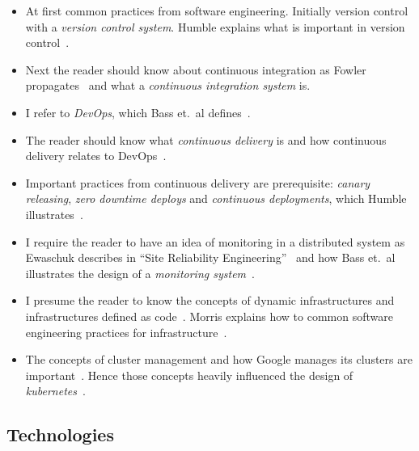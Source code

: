 \begin{itemize}

\item At first common practices from software engineering. Initially
  version control with a \emph{version control system}. Humble explains what is important in
  version control~\cite{cd_humble_config}.

\item Next the reader should know about continuous integration as Fowler
  propagates~\cite{ci_fowler} and what a \emph{continuous
    integration system} is.

\item I refer to \emph{DevOps}, which Bass et.~al defines~\cite{devops_definition}.

\item The reader should know what \emph{continuous delivery} is and how continuous
  delivery relates to DevOps~\cite{cd_wolff_devops}.

\item Important practices from continuous delivery are prerequisite: \emph{canary
    releasing}, \emph{zero downtime deploys} and \emph{continuous deployments}, which
  Humble illustrates~\cite{cd_humble_deploy}.

\item I require the reader to have an idea of monitoring in a distributed system as
  Ewaschuk describes in ``Site Reliability Engineering''~\cite{sre_monitoring} and how
  Bass et.~al illustrates the design of a \emph{monitoring
    system}~\cite{devops_monitoring}.

\item I presume the reader to know the concepts of dynamic infrastructures and
  infrastructures defined as code~\cite{infra_as_code_platforms}. Morris explains how to
  common software engineering practices for
  infrastructure~\cite{infra_as_code_se_practices}.

\item The concepts of cluster management and how Google manages its clusters are
  important~\cite{borg}. Hence those concepts heavily influenced the design of
  \emph{kubernetes}~\cite{borg_kubernetes}.

\end{itemize}

\subsection{Technologies}

